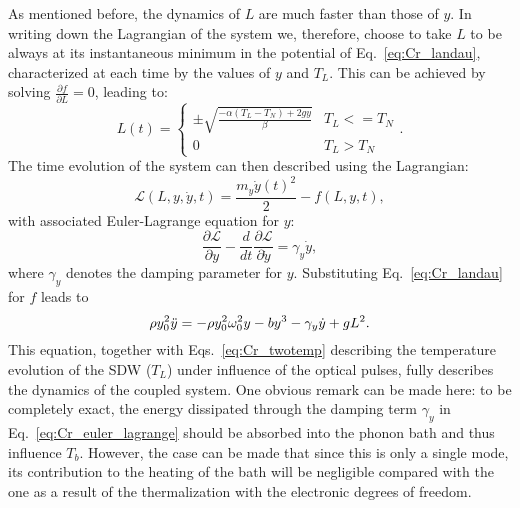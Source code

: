 As mentioned before, the dynamics of $L$ are much faster than those of $y$.
In writing down the Lagrangian of the system we, therefore, choose to take $L$ to be always at its instantaneous minimum in the potential of Eq.~\eqref{eq:Cr_landau}, characterized at each time by the values of $y$ and $T_L$.
This can be achieved by solving $\frac{\partial f}{\partial L} = 0$, leading to:
\begin{equation}
	\label{eq:Cr_L0}
	L(t) =
	\begin{cases}
		\pm \sqrt{\frac{- \alpha (T_L - T_N) + 2 g y}{\beta}} & T_L <= T_N\\
		0 & T_L > T_N
	\end{cases}.
\end{equation}
The time evolution of the system can then described using the Lagrangian:
\begin{equation}
    \mathcal{L}(L, y, \dot{y}, t) = \frac{m_y \dot{y}(t)^2}{2} - f(L, y, t),
\end{equation}
with associated Euler-Lagrange equation for $y$:
\begin{equation}
    \frac{\partial \mathcal{L}}{\partial y} - \frac{d}{dt}\frac{\partial \mathcal{L}}{\partial \dot{y}} = \gamma_y \dot{y},
\end{equation}
where $\gamma_y$ denotes the damping parameter for $y$.
Substituting Eq.~\eqref{eq:Cr_landau} for $f$ leads to 
\begin{equation}
	\label{eq:Cr_euler_lagrange}
	    \rho y_0^2 \Ddot{y} = -\rho y_0^2 \omega_0^2 y  - b y^3 - \gamma_y \dot{y} + gL^2.
\end{equation}
This equation, together with Eqs.~\eqref{eq:Cr_twotemp} describing the temperature evolution of the \gls{SDW} ($T_L$) under influence of the optical pulses, fully describes the dynamics of the coupled system.
One obvious remark can be made here: to be completely exact, the energy dissipated through the damping term $\gamma_y$ in Eq.~\eqref{eq:Cr_euler_lagrange} should be absorbed into the phonon bath and thus influence $T_b$.
However, the case can be made that since this is only a single mode, its contribution to the heating of the bath will be negligible compared with the one as a result of the thermalization with the electronic degrees of freedom.

